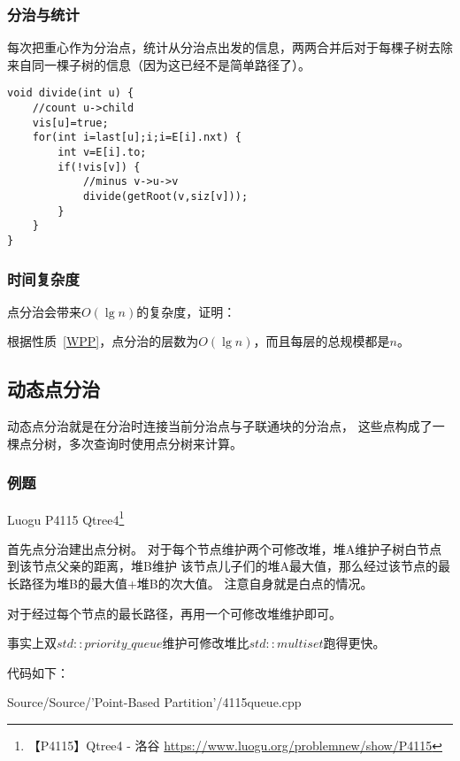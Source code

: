 \subsubsection{分治与统计}
每次把重心作为分治点，统计从分治点出发的信息，两两合并后对于每棵子树去除
来自同一棵子树的信息（因为这已经不是简单路径了）。

\begin{lstlisting}[title=divide]
void divide(int u) {
    //count u->child
    vis[u]=true;
    for(int i=last[u];i;i=E[i].nxt) {
        int v=E[i].to;
        if(!vis[v]) {
            //minus v->u->v
            divide(getRoot(v,siz[v]));
        }
    }
}
\end{lstlisting}

\subsubsection{时间复杂度}
点分治会带来$O(\lg n)$的复杂度，证明：

根据性质~\ref{WPP}，点分治的层数为$O(\lg n)$，而且每层的总规模都是$n$。

\subsection{动态点分治}
动态点分治就是在分治时连接当前分治点与子联通块的分治点，
这些点构成了一棵点分树，多次查询时使用点分树来计算。

\subsubsection{例题}

Luogu P4115 Qtree4\footnote{【P4115】Qtree4 - 洛谷
\url{https://www.luogu.org/problemnew/show/P4115}}

首先点分治建出点分树。
对于每个节点维护两个可修改堆，堆A维护子树白节点到该节点父亲的距离，堆B维护
该节点儿子们的堆A最大值，那么经过该节点的最长路径为堆B的最大值+堆B的次大值。
注意自身就是白点的情况。

对于经过每个节点的最长路径，再用一个可修改堆维护即可。

事实上双$std::priority\_queue$维护可修改堆比$std::multiset$跑得更快。

代码如下：

{Source/Source/'Point-Based Partition'/4115queue.cpp}
